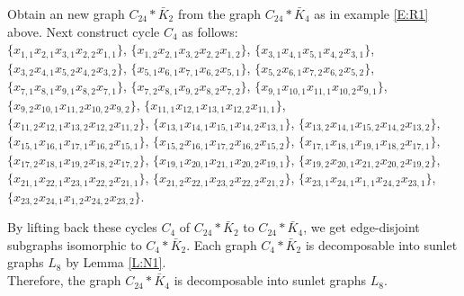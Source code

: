 \documentclass[12pt]{report}
\newtheorem{thm}{Theorem}[section]
\begin{document}
Obtain an new graph $C_{24}*\bar{K}_2$ from the graph
$C_{24}*\bar{K}_4$ as in example \ref{E:R1} above. Next construct
cycle $C_4$ as follows:\\
$\{x_{1,1}x_{2,1}x_{3,1}x_{2,2}x_{1,1}\}$,
$\{x_{1,2}x_{2,1}x_{3,2}x_{2,2}x_{1,2}\}$,
$\{x_{3,1}x_{4,1}x_{5,1}x_{4,2}x_{3,1}\}$,
$\{x_{3,2}x_{4,1}x_{5,2}x_{4,2}x_{3,2}\}$,
$\{x_{5,1}x_{6,1}x_{7,1}x_{6,2}x_{5,1}\}$,
$\{x_{5,2}x_{6,1}x_{7,2}x_{6,2}x_{5,2}\}$,
$\{x_{7,1}x_{8,1}x_{9,1}x_{8,2}x_{7,1}\}$,
$\{x_{7,2}x_{8,1}x_{9,2}x_{8,2}x_{7,2}\}$,
$\{x_{9,1}x_{10,1}x_{11,1}x_{10,2}x_{9,1}\}$,
$\{x_{9,2}x_{10,1}x_{11,2}x_{10,2}x_{9,2}\}$,
$\{x_{11,1}x_{12,1}x_{13,1}x_{12,2}x_{11,1}\}$,\\
$\{x_{11,2}x_{12,1}x_{13,2}x_{12,2}x_{11,2}\}$,
$\{x_{13,1}x_{14,1}x_{15,1}x_{14,2}x_{13,1}\}$,
$\{x_{13,2}x_{14,1}x_{15,2}x_{14,2}x_{13,2}\}$,
$\{x_{15,1}x_{16,1}x_{17,1}x_{16,2}x_{15,1}\}$,
$\{x_{15,2}x_{16,1}x_{17,2}x_{16,2}x_{15,2}\}$,
$\{x_{17,1}x_{18,1}x_{19,1}x_{18,2}x_{17,1}\}$,
$\{x_{17,2}x_{18,1}x_{19,2}x_{18,2}x_{17,2}\}$,
$\{x_{19,1}x_{20,1}x_{21,1}x_{20,2}x_{19,1}\}$,
$\{x_{19,2}x_{20,1}x_{21,2}x_{20,2}x_{19,2}\}$,
$\{x_{21,1}x_{22,1}x_{23,1}x_{22,2}x_{21,1}\}$,
$\{x_{21,2}x_{22,1}x_{23,2}x_{22,2}x_{21,2}\}$,
$\{x_{23,1}x_{24,1}x_{1,1}x_{24,2}x_{23,1}\}$,\\
$\{x_{23,2}x_{24,1}x_{1,2}x_{24,2}x_{23,2}\}$.

By lifting back these cycles $C_4$ of $C_{24}*\bar{K}_2$ to
$C_{24}*\bar{K}_4$, we get edge-disjoint subgraphs isomorphic to
$C_4*\bar{K}_2$. Each graph $C_4*\bar{K}_2$ is decomposable into
sunlet graphs $L_8$ by Lemma \ref{L:N1}.\\
Therefore, the graph $C_{24}*\bar{K}_4$ is decomposable into sunlet
graphs $L_8$.

%
\end{document}
